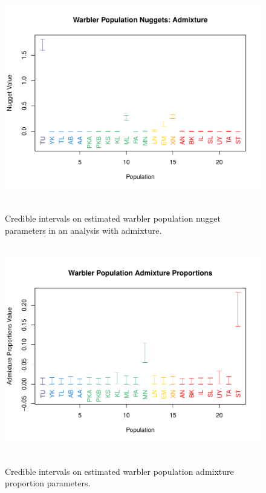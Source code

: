 \documentclass[12pt]{article}
\begin{document}
\begin{figure}
\centering
	{\includegraphics[width=5in,height=3.6in]{figs/warblers/warb_pop_Ad_nugget.pdf}}
	\caption{Credible intervals on estimated warbler population nugget parameters in an analysis with admixture.}\label{sfig:warb_pop_ad_nugg}
\end{figure}

\begin{figure}
\centering
	{\includegraphics[width=5in,height=3.6in]{figs/warblers/warb_pop_adprop.pdf}}
	\caption{Credible intervals on estimated warbler population admixture proportion parameters.}\label{sfig:warb_pop_adprop}
\end{figure}
\end{document}
